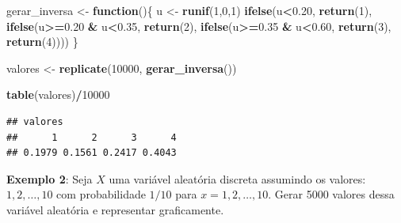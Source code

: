 \documentclass[
]{book}
\newenvironment{Shaded}{\begin{snugshade}}{\end{snugshade}}
\newcommand{\ControlFlowTok}[1]{\textcolor[rgb]{0.13,0.29,0.53}{\textbf{#1}}}
\newcommand{\DecValTok}[1]{\textcolor[rgb]{0.00,0.00,0.81}{#1}}
\newcommand{\FloatTok}[1]{\textcolor[rgb]{0.00,0.00,0.81}{#1}}
\newcommand{\FunctionTok}[1]{\textcolor[rgb]{0.13,0.29,0.53}{\textbf{#1}}}
\newcommand{\NormalTok}[1]{#1}
\newcommand{\OtherTok}[1]{\textcolor[rgb]{0.56,0.35,0.01}{#1}}
\newcommand{\SpecialCharTok}[1]{\textcolor[rgb]{0.81,0.36,0.00}{\textbf{#1}}}
\begin{document}
\begin{Shaded}
\begin{Highlighting}[]
\NormalTok{gerar\_inversa }\OtherTok{\textless{}{-}} \ControlFlowTok{function}\NormalTok{()\{}
\NormalTok{  u }\OtherTok{\textless{}{-}} \FunctionTok{runif}\NormalTok{(}\DecValTok{1}\NormalTok{,}\DecValTok{0}\NormalTok{,}\DecValTok{1}\NormalTok{)}
  \FunctionTok{ifelse}\NormalTok{(u}\SpecialCharTok{\textless{}}\FloatTok{0.20}\NormalTok{, }\FunctionTok{return}\NormalTok{(}\DecValTok{1}\NormalTok{), }
         \FunctionTok{ifelse}\NormalTok{(u}\SpecialCharTok{\textgreater{}=}\FloatTok{0.20} \SpecialCharTok{\&}\NormalTok{ u}\SpecialCharTok{\textless{}}\FloatTok{0.35}\NormalTok{, }\FunctionTok{return}\NormalTok{(}\DecValTok{2}\NormalTok{),}
                \FunctionTok{ifelse}\NormalTok{(u}\SpecialCharTok{\textgreater{}=}\FloatTok{0.35} \SpecialCharTok{\&}\NormalTok{ u}\SpecialCharTok{\textless{}}\FloatTok{0.60}\NormalTok{, }\FunctionTok{return}\NormalTok{(}\DecValTok{3}\NormalTok{), }\FunctionTok{return}\NormalTok{(}\DecValTok{4}\NormalTok{))))}
\NormalTok{\}}

\NormalTok{valores }\OtherTok{\textless{}{-}} \FunctionTok{replicate}\NormalTok{(}\DecValTok{10000}\NormalTok{, }\FunctionTok{gerar\_inversa}\NormalTok{())}

\FunctionTok{table}\NormalTok{(valores)}\SpecialCharTok{/}\DecValTok{10000}
\end{Highlighting}
\end{Shaded}

\begin{verbatim}
## valores
##      1      2      3      4 
## 0.1979 0.1561 0.2417 0.4043
\end{verbatim}

\textbf{Exemplo 2}: Seja \(X\) uma variável aleatória discreta assumindo os
valores: \(1,2,\ldots,10\) com probabilidade \(1/10\) para
\(x=1,2,\ldots,10\). Gerar 5000 valores dessa variável aleatória e representar graficamente.
\end{document}
